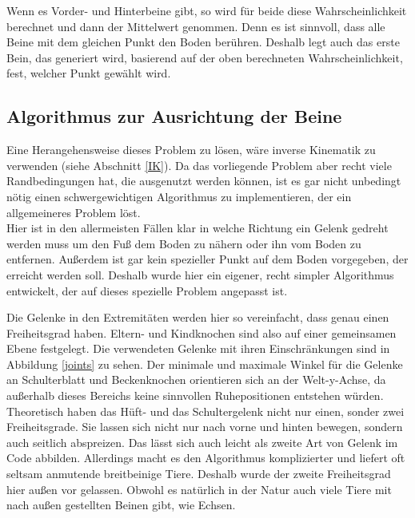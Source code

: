 Wenn es Vorder- und Hinterbeine gibt, so wird für beide diese Wahrscheinlichkeit berechnet und dann der Mittelwert genommen. Denn es ist sinnvoll, dass alle Beine mit dem gleichen Punkt den Boden berühren.
Deshalb legt auch das erste Bein, das generiert wird, basierend auf der oben berechneten Wahrscheinlichkeit, fest, welcher Punkt gewählt wird.


\subsection{Algorithmus zur Ausrichtung der Beine}
\label{leg_algo}

Eine Herangehensweise dieses Problem zu lösen, wäre inverse Kinematik zu verwenden (siehe Abschnitt \ref{IK}). 
Da das vorliegende Problem aber recht viele Randbedingungen hat, die ausgenutzt werden können, ist es gar nicht unbedingt nötig einen schwergewichtigen Algorithmus zu implementieren, der ein allgemeineres Problem löst.\\
Hier ist \zb in den allermeisten Fällen klar in welche Richtung ein Gelenk gedreht werden muss um den Fuß dem Boden zu nähern oder ihn vom Boden zu entfernen. Außerdem ist gar kein spezieller Punkt auf dem Boden vorgegeben, der erreicht werden soll.
Deshalb wurde hier ein eigener, recht simpler Algorithmus entwickelt, der auf dieses spezielle Problem angepasst ist.

Die Gelenke in den Extremitäten werden hier so vereinfacht, dass genau einen Freiheitsgrad haben. Eltern- und Kindknochen sind also auf einer gemeinsamen Ebene festgelegt. Die verwendeten Gelenke mit ihren Einschränkungen sind in Abbildung \ref{joints} zu sehen. Der minimale und maximale Winkel für die Gelenke an Schulterblatt und Beckenknochen orientieren sich an der Welt-y-Achse, da außerhalb dieses Bereichs keine sinnvollen Ruhepositionen entstehen würden. \\
Theoretisch haben das Hüft- und das Schultergelenk nicht nur einen, sonder zwei Freiheitsgrade. Sie lassen sich nicht nur nach vorne und hinten bewegen, sondern auch seitlich abspreizen. Das lässt sich auch leicht als zweite Art von Gelenk im Code abbilden. Allerdings macht es den Algorithmus komplizierter und liefert oft seltsam anmutende breitbeinige Tiere.
Deshalb wurde der zweite Freiheitsgrad hier außen vor gelassen.
Obwohl es natürlich in der Natur auch viele Tiere mit nach außen gestellten Beinen gibt, wie \zb Echsen.


